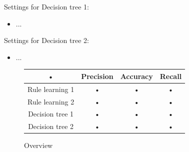 \documentclass[12pt,a4paper]{article}
\begin{document}
Settings for Decision tree 1:
\begin{itemize}
\item ...
\end{itemize}

Settings for Decision tree 2:
\begin{itemize}
\item ...
\end{itemize}

\begin{figure}[H]
\centering
\begin{tabular}{|c|c|c|c|}
\hline 
• & Precision & Accuracy & Recall\\ 
\hline 
Rule learning 1 & • & • & • \\ 
\hline 
Rule learning 2 & • & • & • \\ 
\hline 
Decision tree 1 & • & • & • \\ 
\hline 
Decision tree 2 & • & • & • \\ 
\hline 
\end{tabular} 
\caption{Overview}
\end{figure}
\end{document}
